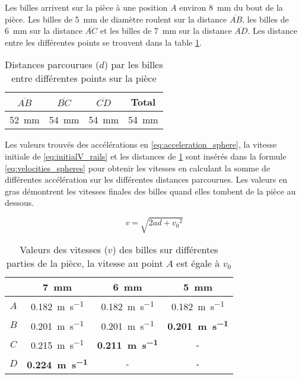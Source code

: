 Les billes arrivent sur la pièce à une position $A$ environ \SI{8}{\mm} du bout de la pièce. Les billes de \SI{5}{\mm} de diamètre roulent sur la distance $\overline{AB}$, les billes de \SI{6}{\mm} sur la distance $\overline{AC}$ et les billes de \SI{7}{\mm} sur la distance $\overline{AD}$. Les distance entre les différentes points se trouvent dans la table \ref{tab:sphere_rolling_distance}.

\begin{table}[htbp]
    \centering
    \begin{tabular}{|c|c|c|c|}
        \hline
        $\overline{AB}$ & $\overline{BC}$ & $\overline{CD}$ & Total \\
        \hline
        \SI{52}{\mm} & \SI{54}{\mm} & \SI{54}{\mm} & \SI{54}{\mm} \\
        \hline
    \end{tabular}
    \caption{Distances parcourues ($d$) par les billes entre différentes points sur la pièce}
    \label{tab:sphere_rolling_distance}
\end{table}

Les valeurs trouvés des accélérations en \ref{eq:acceleration_sphere}, la vitesse initiale de \ref{eq:initialV_rails} et les distances de \ref{tab:sphere_rolling_distance} sont insérés dans la formule \ref{eq:velocities_spheres} pour obtenir les vitesses en calculant la somme de différentes accélération sur les différentes distances parcourues. Les valeurs en gras démontrent les vitesses finales des billes quand elles tombent de la pièce au dessous.

\begin{equation}
    v=\sqrt{2ad +{v_{0}}^{2}}
    \label{eq:velocities_spheres}
\end{equation}

\begin{table}[htbp]
    \centering
    \begin{tabular}{|c|c|c|c|}
        \hline
         & \SI{7}{\mm} & \SI{6}{\mm} & \SI{5}{\mm} \\
        \hline
        $A$ & \SI{0.182}{\m\per\s} & \SI{0.182}{\m\per\s} & \SI{0.182}{\m\per\s} \\
        \hline
        $B$ & \SI{0.201}{\m\per\s} & \SI{0.201}{\m\per\s} & \textbf{\SI{0.201}{\m\per\s}} \\
        \hline
        $C$ & \SI{0.215}{\m\per\s} & \textbf{\SI{0.211}{\m\per\s}} & - \\
        \hline
        $D$ & \textbf{\SI{0.224}{\m\per\s}} & - & - \\
        \hline
    \end{tabular}
    \caption{Valeurs des vitesses ($v$) des billes sur différentes parties de la pièce, la vitesse au point $A$ est égale à $v_{0}$}
    \label{tab:sphere_velocities}
\end{table}

